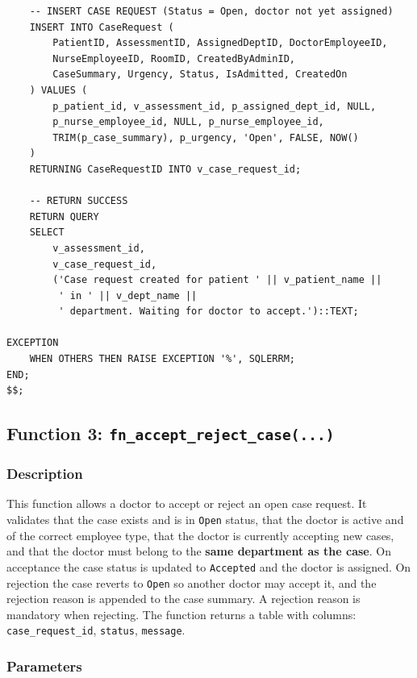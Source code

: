 \documentclass{article}
\begin{document}
\begin{lstlisting}
    -- INSERT CASE REQUEST (Status = Open, doctor not yet assigned)
    INSERT INTO CaseRequest (
        PatientID, AssessmentID, AssignedDeptID, DoctorEmployeeID,
        NurseEmployeeID, RoomID, CreatedByAdminID,
        CaseSummary, Urgency, Status, IsAdmitted, CreatedOn
    ) VALUES (
        p_patient_id, v_assessment_id, p_assigned_dept_id, NULL,
        p_nurse_employee_id, NULL, p_nurse_employee_id,
        TRIM(p_case_summary), p_urgency, 'Open', FALSE, NOW()
    )
    RETURNING CaseRequestID INTO v_case_request_id;

    -- RETURN SUCCESS
    RETURN QUERY
    SELECT
        v_assessment_id,
        v_case_request_id,
        ('Case request created for patient ' || v_patient_name ||
         ' in ' || v_dept_name ||
         ' department. Waiting for doctor to accept.')::TEXT;

EXCEPTION
    WHEN OTHERS THEN RAISE EXCEPTION '%', SQLERRM;
END;
$$;
\end{lstlisting}

\vspace{1em}


\subsection{Function 3: \texttt{fn\_accept\_reject\_case(...)}}

\subsubsection{Description}
This function allows a doctor to accept or reject an open case request. It validates that the case exists and is in \texttt{Open} status, that the doctor is active and of the correct employee type, that the doctor is currently accepting new cases, and that the doctor must belong to the \textbf{same department as the case}. On acceptance the case status is updated to \texttt{Accepted} and the doctor is assigned. On rejection the case reverts to \texttt{Open} so another doctor may accept it, and the rejection reason is appended to the case summary. A rejection reason is mandatory when rejecting. The function returns a table with columns: \texttt{case\_request\_id}, \texttt{status}, \texttt{message}.
\subsubsection{Parameters}
\end{document}
